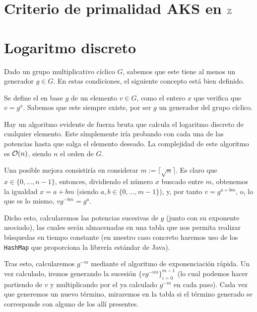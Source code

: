 \documentclass[a4paper, 11pt, twoside, notitlepage, openany, onecolumn, final]{report}
\begin{document}
	\section{Criterio de primalidad AKS en $\mathbb{Z}$}
	\section{Logaritmo discreto}
	Dado un grupo multiplicativo cíclico $G$, sabemos que este tiene al menos un generador $g\in G$. En estas condiciones, el siguiente concepto está bien definido.
	\begin{defi}
		Se define el  en base $g$ de un elemento $v\in G$, como el entero $x$ que verifica que $v = g^x$. Sabemos que este siempre existe, por ser $g$ un generador del grupo cíclico.
	\end{defi}
	Hay un algoritmo evidente de fuerza bruta que calcula el logaritmo discreto de cualquier elemento. Este símplemente iría probando con cada una de las potencias hasta que salga el elemento deseado. La complejidad de este algoritmo es $\mathcal{O}(n)$, siendo $n$ el orden de $G$.
	
	Una posible mejora consistiría en considerar $m:=\lceil\sqrt{n}\rceil$. Es claro que $x\in\{0,\dots,n-1\}$, entonces, dividiendo el número $x$ buscado entre $m$, obtenemos la igualdad $x=a+bm$ (siendo $a,b\in\{0,\dots,m-1\}$), y, por tanto $v=g^{a+bm}$, o, lo que es lo mismo, $vg^{-bm}=g^a$.
	
	Dicho esto, calcularemos las potencias sucesivas de $g$ (junto con su exponente asociado), las cuales serán almacenadas en una tabla que nos permita realizar búsquedas en tiempo constante (en nuestro caso concreto haremos uso de los \texttt{HashMap} que proporciona la librería estándar de Java).
	
	Tras esto, calcularemos $g^{-m}$ mediante el algoritmo de exponenciación rápida. Un vez calculado, iremos generando la sucesión $\{vg^{-im}\}_{i=0}^{m-1}$ (lo cual podemos hacer partiendo de $v$ y multiplicando por el ya calculado $g^{-m}$ en cada paso). Cada vez que generemos un nuevo término, miraremos en la tabla si el término generado se corresponde con alguno de los allí presentes.
	
\end{document}
